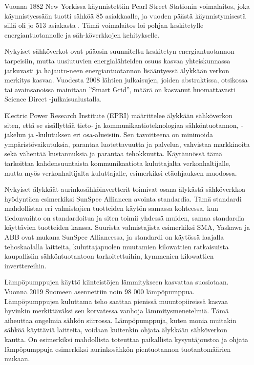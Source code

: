 Vuonna 1882 New Yorkissa käynnistettiin Pearl Street Stationin voimalaitos, joka käynnistyessään tuotti sähköä 85 asiakkaalle, ja vuoden päästä käynnistymisestä sillä oli jo 513 asiakasta \parencite{pearlStreetStation}. Tämä voimalaitos loi pohjan keskitetylle energiantuotannolle ja säh-köverkkojen kehitykselle.

Nykyiset sähköverkot ovat pääosin suunniteltu keskitetyn energiantuotannon tarpeisiin, mutta uusiutuvien energialähteiden osuus kasvaa yhteiskunnassa jatkuvasti ja hajautu-neen energiantuotannon lisääntyessä älykkään verkon merkitys kasvaa. Vuodesta 2008 lähtien julkaisujen, joiden abstraktissa, otsikossa tai avainsanoissa mainitaan ”Smart Grid”, määrä on kasvanut huomattavasti Science Direct -julkaisualustalla. \parencite{Tuballa&Abundo}

Electric Power Research Institute (EPRI) määrittelee älykkään sähköverkon siten, että se sisällyttää tieto- ja kommunikaatioteknologiaa sähköntuotannon, -jakelun ja -kulutuksen eri osa-alueisiin. Sen tavoitteena on minimoida ympäristövaikutuksia, parantaa luotettavuutta ja palvelua, vahvistaa markkinoita sekä vähentää kustannuksia ja parantaa tehokkuutta. Käytännössä tämä tarkoittaa kahdensuuntaista kommunikaatiota kuluttajalta verkonhaltijalle, mutta myös verkonhaltijalta kuluttajalle, esimerkiksi etäohjauksen muodossa. \parencite{SGdefinition}

Nykyiset älykkäät aurinkosähköinvertterit toimivat osana älykästä sähköverkkoa hyödyntäen esimerkiksi SunSpec Alliancen avointa standardia. Tämä standardi mahdollistaa eri valmistajien tuotteiden käytön samassa kohteessa, kun tiedonvaihto on standardoitua ja siten toimii yhdessä muiden, samaa standardia käyttävien tuotteiden kanssa. Suurista valmistajista esimerkiksi SMA, Yaskawa ja ABB ovat mukana SunSpec Alliancessa, ja standardi on käytössä laajalla tehoskaalalla laitteita, kuluttajapuolen muutamien kilowattien ratkaisuista kaupallisiin sähköntuotantoon tarkoitettuihin, kymmenien kilowattien inverttereihin. \parencite{SSProds}

Lämpöpumppujen käyttö kiinteistöjen lämmitykseen kasvattaa suosiotaan. Vuonna 2019 Suomeen asennettiin noin 98 000 lämpöpumppua\parencite{sulpu}. Lämpöpumppujen kuluttama teho saattaa pienissä muuntopiireissä kasvaa hyvinkin merkittäväksi sen korvatessa vanhoja lämmitysmenetelmiä. Tämä aiheuttaa ongelmia sähkön siirrossa. Lämpöpumppuja, kuten monia muitakin sähköä käyttäviä laitteita, voidaan kuitenkin ohjata älykkään sähköverkon kautta. On esimerkiksi mahdollista toteuttaa paikallista kysyntäjoustoa ja ohjata lämpöpumppuja esimerkiksi aurinkosähkön pientuotannon tuotantomäärien mukaan.

